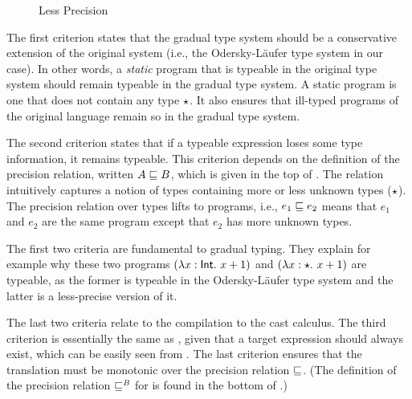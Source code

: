 \begin{figure}[t]
  \begin{small}


  \end{small}
  \caption{Less Precision}
  \label{fig:lessp}
\end{figure}


The first criterion states that the gradual type system should be a conservative
extension of the original system (i.e., the Odersky-L{\"a}ufer type system in
our case). In other words, a \textit{static} program that is typeable in the
original type system should remain typeable in the gradual type
system. A static program is one that does not contain any type $\star$. It also
ensures that ill-typed programs of the original language remain so in the
gradual type system.

The second criterion states that if a typeable expression loses some type
information, it remains typeable. This criterion depends on the definition of
the precision relation, written $A \sqsubseteq B$, which is given in the top of
. The relation intuitively captures a notion of types containing
more or less unknown types ($\star$). The precision relation over types lifts
to programs, i.e., $e_1 \sqsubseteq e_2$ means that $e_1$ and $e_2$ are the same
program except that $e_2$ has more unknown types.

The first two criteria are fundamental to gradual typing. They explain for
example why these two programs $(\lambda x:\mathsf{Int}.~ {x + 1})$ and $(\lambda x:\star.~
{x + 1})$ are typeable, as the former is typeable in the Odersky-L{\"a}ufer type
system and the latter is a less-precise version of it.

The last two criteria relate to the compilation to the cast calculus. The
third criterion is essentially the same as , given that
a target expression should always exist, which can be easily seen from
. The last criterion ensures that the translation
must be monotonic over the precision relation $\sqsubseteq$. (The definition of the
precision relation $\sqsubseteq^{\mathit{B}}$ for \pbc is found in the bottom of
.)


